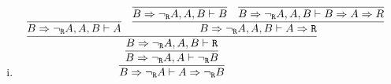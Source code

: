     \begin{enumerate}[(i)]
        \item 
            $$
                \infer{
                    B \Rightarrow \neg_\R A \vdash A \Rightarrow \neg_\R B
                }{
                    \infer{
                        B \Rightarrow \neg_\R A, A \vdash \neg_\R B
                    }{
                        \infer{
                            B \Rightarrow \neg_\R A, A, B \vdash \R
                        }{
                            \infer{
                                B \Rightarrow \neg_\R A, A, B \vdash A
                            }{
                            }&
                            \infer{
                                B \Rightarrow \neg_\R A, A, B \vdash A\Rightarrow \R
                            }{
                                \infer{
                                    B \Rightarrow \neg_\R A, A, B \vdash B
                                }{
                                }&
                                \infer{
                                    B \Rightarrow \neg_\R A, A, B \vdash B \Rightarrow A \Rightarrow R
                                }{
                                }
                            }
                        }
                    }
                }
            $$
            

\end{enumerate}
